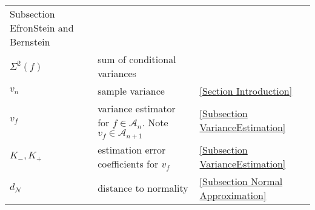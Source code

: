 \documentclass[final,12pt]{colt2018} %
\begin{document}
\begin{tabular}{|l|l|l|}
							{Subsection EfronStein and Bernstein} \\ 
							$\Sigma ^{2}\left( f\right) $ & sum of conditional variances & \ref%
							{Subsection EfronStein and Bernstein} \\ 
							$v_{n}$ & sample variance & \ref{Section Introduction} \\ 
							$v_{f}$ & variance estimator for $f\in \mathcal{A}_{n}$. Note $v_{f}\in 
							\mathcal{A}_{n+1}$ & \ref{Subsection VarianceEstimation} \\ 
							$K_{-},K_{+}$ & estimation error coefficients for $v_{f}$ & \ref{Subsection
								VarianceEstimation} \\ 
							$d_{\mathcal{N}}$ & distance to normality & \ref{Subsection Normal
								Approximation}\\
							\hline
						\end{tabular}
						
						
						
\end{document}
